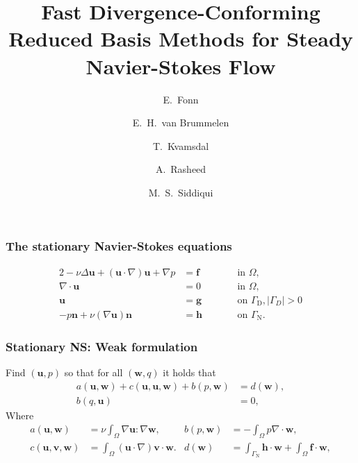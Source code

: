 \documentclass{beamer}
\begin{document}
\title[Div-conforming RBMs]{
  Fast Divergence-Conforming Reduced Basis Methods for Steady Navier-Stokes Flow
}
\author[E. Fonn]{
  E.~Fonn \and
  E.~H.~van Brummelen \and
  T.~Kvamsdal \and
  A.~Rasheed \and
  M.~S.~Siddiqui
}
\date[ECCM 2018]{}



\begin{frame}
  \titlepage
\end{frame}

\begin{frame}
  \frametitle{The stationary Navier-Stokes equations}

  \begin{alignat}{2}
    \label{eqn:ns-1}
    -\nu \Delta \bm u + (\bm u \cdot \nabla) \bm u + \nabla p &= \bm f && \qquad \text{in } \Omega, \\
    \label{eqn:ns-2}
    \nabla \cdot \bm u &= 0 && \qquad \text{in } \Omega, \\
    \label{eqn:ns-3}
    \bm u &= \bm g && \qquad \text{on } \Gamma_\text{D}, |\Gamma_D| > 0 \\
    \label{eqn:ns-4}
    -p \bm n + \nu (\nabla \bm u) \bm n &= \bm h && \qquad \text{on } \Gamma_\text{N}.
  \end{alignat}
\end{frame}

\begin{frame}
  \frametitle{Stationary NS: Weak formulation}

  Find $(\bm u, p)$ so that for all $(\bm w, q)$ it holds that
  \begin{align}
    a(\bm u, \bm w) + c(\bm u, \bm u, \bm w) + b(p, \bm w) &= d(\bm w), \label{eqn:var-1} \\
    b(q, \bm u) &= 0, \label{eqn:var-2}
  \end{align}
  Where
  \begin{align*}
    a(\bm u, \bm w) &= \nu \int_\Omega \nabla \bm u : \nabla \bm w,
    &b(p, \bm w) &= -\int_\Omega p \nabla \cdot \bm w, \\
    c(\bm u, \bm v, \bm w) &= \int_\Omega (\bm u \cdot \nabla) \bm v \cdot \bm w.
    &d(\bm w) &= \int_{\Gamma_\text{N}} \bm h \cdot \bm w + \int_{\Omega} \bm f \cdot \bm w,
  \end{align*}
\end{frame}
\end{document}
